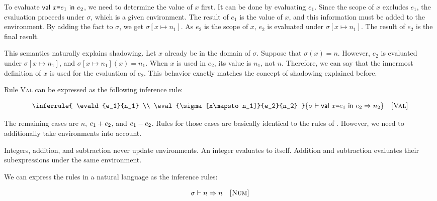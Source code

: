 To evaluate $\textsf{val}\ x\texttt{=} e_1\ \textsf{in}\ e_2$, we need to determine the value of $x$ first.
It can be done by evaluating $e_1$. Since the scope of $x$ excludes $e_1$,
the evaluation proceeds under $\sigma$, which is a given environment.
The result of $e_1$ is the value of $x$, and this information must be added to
the environment. By adding the fact to $\sigma$, we get $\sigma[x\mapsto n_1]$.
As $e_2$ is the scope of $x$, $e_2$ is evaluated under $\sigma[x\mapsto n_1]$.
The result of $e_2$ is the final result.

This semantics naturally explains shadowing. Let $x$ already be in the domain of
$\sigma$. Suppose that $\sigma(x)=n$. However, $e_2$ is evaluated under
$\sigma[x\mapsto n_1]$, and $\sigma[x\mapsto n_1](x)=n_1$. When $x$ is used in
$e_2$, its value is $n_1$, not $n$. Therefore, we can say that the
innermost definition of $x$ is used for the evaluation of $e_2$. This behavior
exactly matches the concept of shadowing explained before.

Rule \textsc{Val} can be expressed as the following inference rule:

\[
\inferrule
{
  \evald{e_1}{n_1} \\
  \eval{\sigma[x\mapsto n_1]}{e_2}{n_2}
}
{ \evald{\ebind{x}{e_1}{e_2}}{n_2} }
\quad\textsc{[Val]}
\]

The remaining cases are $n$, $e_1+e_2$, and $e_1-e_2$.
Rules for those cases are basically identical to the rules of \plang.
However, we need to additionally take environments into account.


\vspace{-1em}


\vspace{-1em}


Integers, addition, and subtraction never update environments.
An integer evaluates to itself. Addition and subtraction evaluates their
subexpressions under the same environment.

We can express the rules in a natural language as the inference rules:

\[
  \sigma\vdash n\Rightarrow n\quad\textsc{[Num]}
\]

